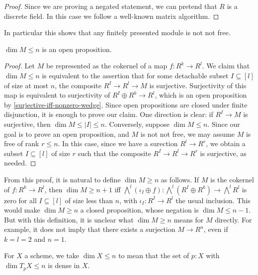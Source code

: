 \begin{proof}
Since we are proving a negated statement, we can pretend that $R$ is a discrete field.
In this case we follow a well-known matrix algorithm. %
\end{proof}
In particular this shows that any finitely presented module is not not free.
\begin{lemma}
$\dim M \le n$ is an open proposition.
\end{lemma}
\begin{proof}
Let $M$ be represented as the cokernel of a map $f : R^k \to R^l$.
We claim that $\dim M \le n$ is equivalent to the assertion that
for some detachable subset $I \subseteq [l]$ of size at most $n$,
the composite $R^I \to R^l \to M$ is surjective.
Surjectivity of this map is equivalent to surjectivity of
$R^I \oplus R^k \to R^l$, which is an
open proposition by \cref{surjective-iff-nonzero-wedge}.
Since open propositions are closed under finite disjunction, it is enough
to prove our claim.
One direction is clear: if $R^I \to M$ is surjective, then $\dim M \le |I| \le n$.
Conversely, suppose $\dim M \le n$. Since our goal is to prove an
open proposition, and $M$ is not not free, we may assume $M$ is free
of rank $r \le n$. In this case, since we have a surection $R^l \to R^r$, 
we obtain a subset $I \subseteq [l]$
of size $r$ such that the composite $R^I \to R^l \to R^r$ is surjective,
as needed.
\end{proof}

From this proof, it is natural to define $\dim M \ge n$ as follows.
If $M$ is the cokernel of $f : R^k \to R^l$, then $\dim M \ge n+1$
iff $\bigwedge^l (\iota_I \oplus f) : \bigwedge^l (R^I \oplus R^k) \to \bigwedge^l R^l$
is zero for all $I \subseteq [l]$ of size less than $n$, with $\iota_I : R^I \to R^l$
the usual inclusion. This would make $\dim M \ge n$ a closed proposition,
whose negation is $\dim M \le n-1$. But with this definition, it is unclear
what $\dim M \ge n$ means for $M$ directly. For example, it does not imply that
there exists a surjection $M \to R^n$, even if $k = l = 2$ and $n = 1$.

\begin{definition}
For $X$ a scheme, we take $\dim X \le n$ to mean that
the set of $p : X$ with $\dim T_p X \le n$ is dense in $X$.
\end{definition}
